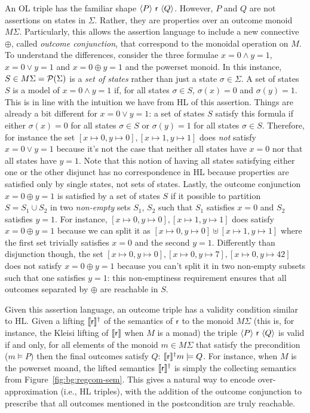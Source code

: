 An OL triple has the familiar shape $\langle {P}\rangle~\mathsf{r}~\langle{Q}\rangle$. However, $P$ and $Q$ are not assertions on states in $\Sigma$. Rather, they are properties over an outcome monoid $M \Sigma$. Particularly, this allows the assertion language to include a new connective $\oplus$, called \emph{outcome conjunction}, that correspond to the monoidal operation on $M$.
To understand the differences, consider the three formulae $x = 0 \land y = 1$, $x = 0 \lor y = 1$ and $x = 0 \oplus y = 1$ and the powerset monoid. In this instance, $S \in M \Sigma = \mathcal{P}(\Sigma)$ is a \emph{set of states} rather than just a state $\sigma \in \Sigma$. A set of states $S$ is a model of $x = 0 \land y = 1$ if, for all states $\sigma \in S$, $\sigma(x) = 0$ and $\sigma(y) = 1$. This is in line with the intuition we have from HL of this assertion. Things are already a bit different for $x = 0 \lor y = 1$: a set of states $S$ satisfy this formula if either $\sigma(x) = 0$ for all states $\sigma \in S$ or $\sigma(y) =1$ for all states $\sigma \in S$. Therefore, for instance the set ${[x \mapsto 0, y \mapsto 0], [x \mapsto 1, y \mapsto 1]}$ does \emph{not} satisfy $x = 0 \lor y = 1$ because it's not the case that neither all states have $x = 0$ nor that all states have $y = 1$. Note that this notion of having all states satisfying either one or the other disjunct has no correspondence in HL because properties are satisfied only by single states, not sets of states. Lastly, the outcome conjunction $x = 0 \oplus y = 1$ is satisfied by a set of states $S$ if it possible to partition $S = S_1 \cup S_2$ in two \emph{non-empty} sets $S_1$, $S_2$ such that $S_1$ satisfies $x = 0$ and $S_2$ satisfies $y = 1$. For instance,  ${[x \mapsto 0, y \mapsto 0], [x \mapsto 1, y \mapsto 1]}$ does satisfy $x = 0 \oplus y = 1$ because we can split it as ${[x \mapsto 0, y \mapsto 0]} \uplus {[x \mapsto 1, y \mapsto 1]}$ where the first set trivially satisfies $x = 0$ and the second $y = 1$. Differently than disjunction though, the set ${[x \mapsto 0, y \mapsto 0], [x \mapsto 0, y \mapsto 7], [x \mapsto 0, y \mapsto 42]}$ does not satisfy $x = 0 \oplus y = 1$ because you can't split it in two non-empty subsets such that one satisfies $y = 1$: this non-emptiness requirement ensures that all outcomes separated by $\oplus$ are reachable in $S$.

Given this assertion language, an outcome triple has a validity condition similar to HL. Given a lifting $\llbracket\mathsf{r}\rrbracket^{\dagger}$ of the semantics of $\mathsf{r}$ to the monoid $M \Sigma$ (this is, for instance, the Kleisi lifting of $\llbracket\mathsf{r}\rrbracket$ when $M$ is a monad) the triple $\langle {P}\rangle~\mathsf{r}~\langle{Q}\rangle$ is valid if and only, for all elements of the monoid $m \in M \Sigma$ that satisfy the precondition ($m \models P)$ then the final outcomes satisfy $Q$: $\llbracket\mathsf{r}\rrbracket^{\dagger} m \models Q$. For instance, when $M$ is the powerset moand, the lifted semantics $\llbracket\mathsf{r}\rrbracket^{\dagger}$ is simply the collecting semantics from Figure~\ref{fig:bg:regcom-sem}. This gives a natural way to encode over-approximation (i.e., HL triples), with the addition of the outcome conjunction to prescribe that all outcomes mentioned in the postcondition are truly reachable.

